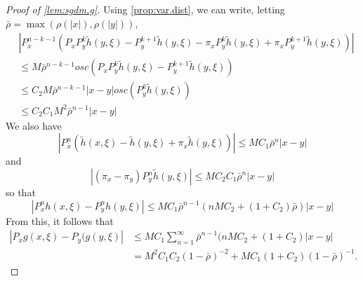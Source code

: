 \begin{proof}[Proof of \cref{lem:sgdm.g}]
Using \cref{prop:var.dist}, we can write, letting $\bar \rho = \max(\rho(|x|), \rho(|y|))$,
\begin{align*}
&|P_x^{n-k-1}(P_xP_y^k \tilde h(y, \xi) - P_y^{k+1} \tilde h(y, \xi) - \pi_xP_y^k \tilde h(y, \xi) + \pi_xP_y^{k+1} \tilde h(y, \xi) )| \\
&\leq
M {\bar \rho}^{n-k-1} \mathit{osc} (P_xP_y^k \tilde h(y, \xi) - P_y^{k+1} \tilde h(y, \xi))\\
&\leq C_2M {\bar \rho}^{n-k-1} |x-y| \mathit{osc} (P_y^k \tilde h(y, \xi))\\
&\leq C_2C_1 M^2 {\bar \rho}^{n-1} |x-y|
\end{align*}
We also have
\[
|P_x^n (\tilde h(x, \xi) - \tilde h(y, \xi) + \pi_x \tilde h(y, \xi)) |\leq MC_1 {\bar \rho}^n |x-y|
\]
and
\[
 |(\pi_x - \pi_y) P_y^{n} \tilde h(y, \xi)| \leq MC_2C_1 {\bar \rho}^n |x-y|
 \]
 so that
\[
|P_x^n h(x, \xi) - P_y^n h(y, \xi)| \leq MC_1 \bar\rho^{n-1} (nMC_2 + (1+C_2)\bar \rho)|x-y|
\]
From this, it follows that 
\begin{align*}
|P_x g(x, \xi) - P_y(g(y, \xi)| & \leq MC_1 \sum_{n=1}^\infty \bar\rho^{n-1} (nMC_2 + (1+C_2)|x-y|\\
&= M^2C_1C_2 (1-\bar\rho)^{-2} + MC_1(1+C_2) (1-\bar \rho)^{-1}.
\end{align*}


\end{proof}



 
